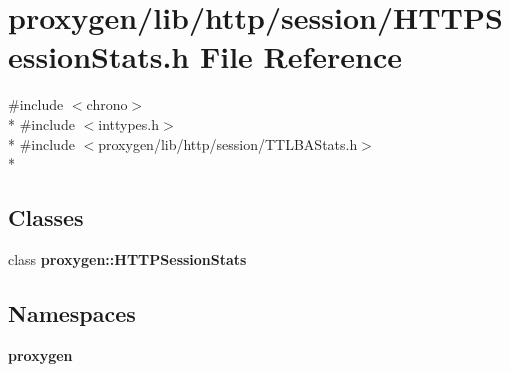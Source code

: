 \section{proxygen/lib/http/session/\+H\+T\+T\+P\+Session\+Stats.h File Reference}
\label{HTTPSessionStats_8h}
{\ttfamily \#include $<$chrono$>$}\\*
{\ttfamily \#include $<$inttypes.\+h$>$}\\*
{\ttfamily \#include $<$proxygen/lib/http/session/\+T\+T\+L\+B\+A\+Stats.\+h$>$}\\*
\subsection*{Classes}
\begin{DoxyCompactItemize}
\item 
class {\bf proxygen\+::\+H\+T\+T\+P\+Session\+Stats}
\end{DoxyCompactItemize}
\subsection*{Namespaces}
\begin{DoxyCompactItemize}
\item 
 {\bf proxygen}
\end{DoxyCompactItemize}
